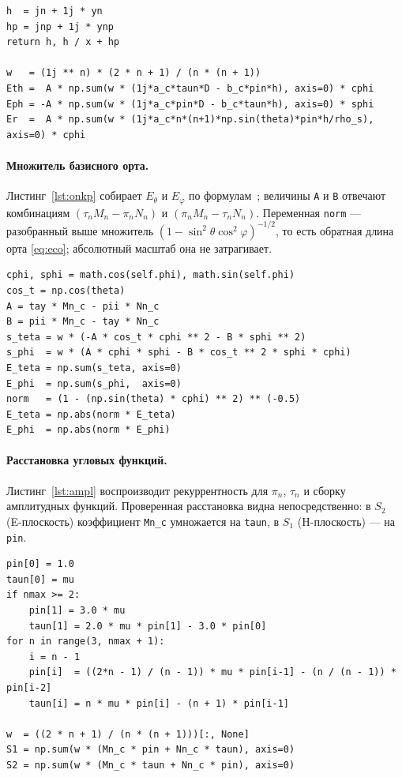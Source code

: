 \documentclass[11pt,a4paper]{article}
\begin{document}
\begin{lstlisting}[style=py,caption={\texttt{green\_tensor/nearfield.py} ---
\texttt{\_hankel\_out} (строки 1--3) и сборка точного радиального ряда
\eqref{eq:near-Eth}--\eqref{eq:near-Er}},label={lst:near}]
h  = jn + 1j * yn
hp = jnp + 1j * ynp
return h, h / x + hp

w   = (1j ** n) * (2 * n + 1) / (n * (n + 1))
Eth =  A * np.sum(w * (1j*a_c*taun*D - b_c*pin*h), axis=0) * cphi
Eph = -A * np.sum(w * (1j*a_c*pin*D - b_c*taun*h), axis=0) * sphi
Er  =  A * np.sum(w * (1j*a_c*n*(n+1)*np.sin(theta)*pin*h/rho_s), axis=0) * cphi
\end{lstlisting}

\paragraph{Множитель базисного орта.}
Листинг~\ref{lst:onkp} собирает $E_\theta$ и $E_\varphi$ по
формулам~\cite{denisov2016tensors}; величины \texttt{A} и \texttt{B} отвечают
комбинациям $(\tau_nM_n - \pi_nN_n)$ и $(\pi_nM_n - \tau_nN_n)$.
Переменная \texttt{norm} --- разобранный выше множитель
$(1-\sin^2\theta\cos^2\varphi)^{-1/2}$, то есть обратная длина орта \eqref{eq:eco};
абсолютный масштаб она не затрагивает.

\begin{lstlisting}[style=py,caption={\texttt{sphere\_core.py::MieSphere.pattern} ---
сборка линейной поляризации в базисе основной/кросс},label={lst:onkp}]
cphi, sphi = math.cos(self.phi), math.sin(self.phi)
cos_t = np.cos(theta)
A = tay * Mn_c - pii * Nn_c
B = pii * Mn_c - tay * Nn_c
s_teta = w * (-A * cos_t * cphi ** 2 - B * sphi ** 2)
s_phi  = w * (A * cphi * sphi - B * cos_t ** 2 * sphi * cphi)
E_teta = np.sum(s_teta, axis=0)
E_phi  = np.sum(s_phi,  axis=0)
norm   = (1 - (np.sin(theta) * cphi) ** 2) ** (-0.5)
E_teta = np.abs(norm * E_teta)
E_phi  = np.abs(norm * E_phi)
\end{lstlisting}

\paragraph{Расстановка угловых функций.}
Листинг~\ref{lst:ampl} воспроизводит рекуррентность для $\pi_n$, $\tau_n$ и сборку
амплитудных функций. Проверенная расстановка видна непосредственно: в $S_2$
(E-плоскость) коэффициент \texttt{Mn\_c} умножается на \texttt{taun}, в $S_1$
(H-плоскость) --- на \texttt{pin}.

\begin{lstlisting}[style=py,caption={\texttt{green\_tensor/\_angular.py::pi\_tau} и
\texttt{sphere\_core.py::MieSphere.amplitudes}},label={lst:ampl}]
pin[0] = 1.0
taun[0] = mu
if nmax >= 2:
    pin[1] = 3.0 * mu
    taun[1] = 2.0 * mu * pin[1] - 3.0 * pin[0]
for n in range(3, nmax + 1):
    i = n - 1
    pin[i]  = ((2*n - 1) / (n - 1)) * mu * pin[i-1] - (n / (n - 1)) * pin[i-2]
    taun[i] = n * mu * pin[i] - (n + 1) * pin[i-1]

w  = ((2 * n + 1) / (n * (n + 1)))[:, None]
S1 = np.sum(w * (Mn_c * pin + Nn_c * taun), axis=0)
S2 = np.sum(w * (Mn_c * taun + Nn_c * pin), axis=0)
\end{lstlisting}
\end{document}
